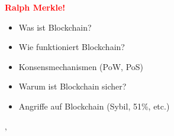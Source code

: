 

\textbf{\textcolor{red}{Ralph Merkle!}}
\begin{itemize}
    \item Was ist Blockchain?
    \item Wie funktioniert Blockchain?
    \item Konsensmechanismen (PoW, PoS)
    \item Warum ist Blockchain sicher?
    \item Angriffe auf Blockchain (Sybil, 51\%, etc.)
\end{itemize}


‚